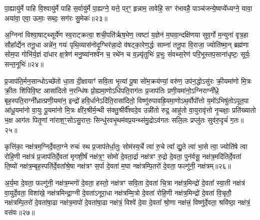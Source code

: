 पा॒ह्यायु॑र्मे पाहि वि॒श्वायु॑र्मे पाहि स॒र्वायु॑र्मे पा॒ह्यग्ने॒ यत्ते॒ पर॒ꣳ॒ हृन्नाम॒ तावेहि॒ सꣳ र॑भावहै॒ पाञ्च॑जन्ये॒ष्वप्ये᳚ध्यग्ने॒ यावा॒ अया॑वा॒ एवा॒ ऊमाः॒ सब्दः॒ सग॑रः सु॒मेकः॑॥२३॥

{\anuvakamend[{व्या॒नम्मे॒ द्वात्रिꣳ॑शच्च॥७॥}]}

अ॒ग्निना॑ विश्वा॒षाट्थ्सूर्ये॑ण स्व॒राट्क्रत्वा॒ शची॒पति॑र्\mbox{}ऋष॒भेण॒ त्वष्टा॑ य॒ज्ञेन॑ म॒घवा॒न्दक्षि॑णया सुव॒र्गो म॒न्युना॑ वृत्र॒हा सौहा᳚र्द्येन तनू॒धा अन्ने॑न॒ गयः॑ पृथि॒व्यास॑नोदृ॒ग्भिर॑न्ना॒दो व॑षट्का॒रेण॒र्द्धः साम्ना॑ तनू॒पा वि॒राजा॒ ज्योति॑ष्मा॒न् ब्रह्म॑णा सोम॒पा गोभि॑र्य॒ज्ञं दा॑धार क्ष॒त्रेण॑ मनु॒ष्या॑नश्वे॑न च॒ रथे॑न च व॒ज्र्यृ॑तुभिः॑ प्र॒भुः सं॑वथ्स॒रेण॑ परि॒भूस्तप॒साना॑धृष्टः॒ सूर्यः॒ सन्त॒नूभिः॑॥२४॥

{\anuvakamend[{अ॒ग्निनैका॒न्नप॑ञ्चा॒शत्॥८॥}]}

प्र॒जाप॑ति॒र्मन॒सान्धो\-ऽच्छे॑तो धा॒ता दी॒क्षायाꣳ॑ सवि॒ता भृ॒त्यां पू॒षा सो॑म॒क्रय॑ण्यां॒ वरु॑ण॒ उप॑न॒द्धो\-ऽसु॑रः क्री॒यमा॑णो मि॒त्रः क्री॒तः शि॑पिवि॒ष्ट आसा॑दितो न॒रन्धि॑षः प्रो॒ह्यमा॒णो\-ऽधि॑पति॒राग॑तः प्र॒जाप॑तिः प्रणी॒यमा॑नो॒\-ऽग्निराग्नी᳚ध्रे॒ बृह॒स्पति॒राग्नी᳚ध्रात्प्रणी॒यमा॑न॒ इन्द्रो॑ हवि॒र्धाने\-ऽदि॑ति॒रासा॑दितो॒ विष्णु॑रुपावह्रि॒यमा॒णो\-ऽथ॒र्वोपो᳚त्तो य॒मो॑\-ऽभिषु॑तो\-ऽपूत॒पा आ॑धू॒यमा॑नो वा॒युः पू॒यमा॑नो मि॒त्रः क्षी॑र॒श्रीर्म॒न्थी स॑क्तु॒श्रीर्वै᳚श्वदे॒व उन्नी॑तो रुद्र॒ आहु॑तो वा॒युरावृ॑त्तो नृ॒चक्षाः॒ प्रति॑ख्यातो भ॒क्ष आग॑तः पितृ॒णां ना॑राश॒ꣳ॒सो\-ऽसु॒रात्तः॒ सिन्धु॑रवभृ॒थम॑वप्र॒यन्थ्स॑मु॒द्रो\-ऽव॑गतः सलि॒लः प्रप्लु॑तः सुव॑रु॒दृचं॑ ग॒तः॥२५॥

{\anuvakamend[{रु॒द्र एक॑विꣳशतिश्च॥८॥}]}

कृत्ति॑का॒ नक्ष॑त्रम॒ग्निर्दे॒वता॒ग्ने रुचः॑ स्थ प्र॒जाप॑तेर्धा॒तुः सोम॑स्य॒र्चे त्वा॑ रु॒चे त्वा᳚ द्यु॒ते त्वा॑ भा॒से त्वा॒ ज्योति॑षे त्वा रोहि॒णी नक्ष॑त्रं प्र॒जाप॑तिर्दे॒वता॑ मृगशी॒र्\mbox{}षं नक्ष॑त्र॒ꣳ॒ सोमो॑ दे॒वता॒र्द्रा नक्ष॑त्रꣳ रु॒द्रो दे॒वता॒ पुन॑र्वसू॒ नक्ष॑त्र॒मदि॑ति\-र्दे॒वता॑ ति॒ष्यो॑ नक्ष॑त्र॒म्बृह॒स्पति॑र्दे॒वता᳚श्रे॒षा नक्ष॑त्रꣳ स॒र्पा दे॒वता॑ म॒घा नक्ष॑त्रम्पि॒तरो॑ दे॒वता॒ फल्गु॑नी॒ नक्ष॑त्रम्॥२६॥

अ॒र्य॒मा दे॒वता॒ फल्गु॑नी॒ नक्ष॑त्र॒म्भगो॑ दे॒वता॒ हस्तो॒ नक्ष॑त्रꣳ सवि॒ता दे॒वता॑ चि॒त्रा नक्ष॑त्र॒मिन्द्रो॑ दे॒वता᳚ स्वा॒ती नक्ष॑त्रं वा॒युर्दे॒वता॒ विशा॑खे॒ नक्ष॑त्रमिन्द्रा॒ग्नी दे॒वता॑\-ऽनूरा॒धा नक्ष॑त्रम्मि॒त्रो दे॒वता॑ रोहि॒णी नक्ष॑त्र॒मिन्द्रो॑ दे॒वता॑ वि॒चृतौ॒ नक्ष॑त्रम्पि॒तरो॑ दे॒वता॑षा॒ढा नक्ष॑त्र॒मापो॑ दे॒वता॑षा॒ढा नक्ष॑त्रं॒ विश्वे॑ दे॒वा दे॒वता᳚ श्रो॒णा नक्ष॑त्त्रं॒ विष्णु॑र्दे॒वता॒ श्रवि॑ष्ठा॒ नक्ष॑त्रं॒ वस॑वः॥२७॥

